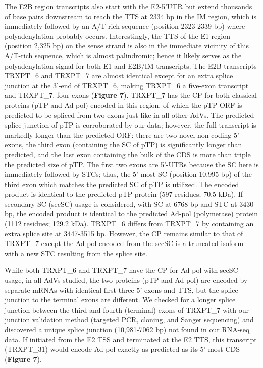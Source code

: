 \documentclass[
]{article}
\begin{document}
The E2B region transcripts also start with the E2-5'UTR but extend
thousands of base pairs downstream to reach the TTS at 2334 bp in the IM
region, which is immediately followed by an A/T-rich sequence (position
2323-2339 bp) where polyadenylation probably occurs. Interestingly, the
TTS of the E1 region (position 2,325 bp) on the sense strand is also in
the immediate vicinity of this A/T-rich sequence, which is almost
palindromic; hence it likely serves as the polyadenylation signal for
both E1 and E2B/IM transcripts. The E2B transcripts TRXPT\_6 and
TRXPT\_7 are almost identical except for an extra splice junction at the
3'-end of TRXPT\_6, making TRXPT\_6 a five-exon transcript and TRXPT\_7,
four exons (\textbf{Figure 7}). TRXPT\_7 has the CP for both classical
proteins (pTP and Ad-pol) encoded in this region, of which the pTP ORF
is predicted to be spliced from two exons just like in all other AdVs.
The predicted splice junction of pTP is corroborated by our data;
however, the full transcript is markedly longer than the predicted ORF:
there are two novel non-coding 5' exons, the third exon (containing the
SC of pTP) is significantly longer than predicted, and the last exon
containing the bulk of the CDS is more than triple the predicted size of
pTP. The first two exons are 5'-UTRs because the SC here is immediately
followed by STCs; thus, the 5'-most SC (position 10,995 bp) of the third
exon which matches the predicted SC of pTP is utilized. The encoded
product is identical to the predicted pTP protein (597 residues; 70.5
kDa). If secondary SC (secSC) usage is considered, with SC at 6768 bp
and STC at 3430 bp, the encoded product is identical to the predicted
Ad-pol (polymerase) protein (1112 residues; 129.2 kDa). TRXPT\_6 differs
from TRXPT\_7 by containing an extra splice site at 3447-3515 bp.
However, the CP remains similar to that of TRXPT\_7 except the Ad-pol
encoded from the secSC is a truncated isoform with a new STC resulting
from the splice site.

While both TRXPT\_6 and TRXPT\_7 have the CP for Ad-pol with secSC
usage, in all AdVs studied, the two proteins (pTP and Ad-pol) are
encoded by separate mRNAs with identical first three 5' exons and TTS,
but the splice junction to the terminal exons are different. We checked
for a longer splice junction between the third and fourth (terminal)
exons of TRXPT\_7 with our junction validation method (targeted PCR,
cloning, and Sanger sequencing) and discovered a unique splice junction
(10,981-7062 bp) not found in our RNA-seq data. If initiated from the E2
TSS and terminated at the E2 TTS, this transcript (TRXPT\_31) would
encode Ad-pol exactly as predicted as its 5'-most CDS (\textbf{Figure
7}).
\end{document}
